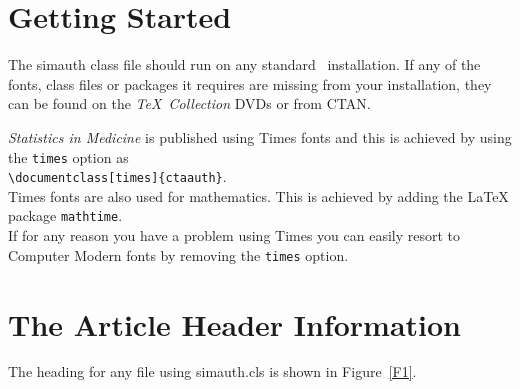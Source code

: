 \documentclass[times]{simauth}
\begin{document}
\section{Getting Started} The \textsf{simauth} class file should run
on any standard \LaTeXe\ installation. If any of the fonts, class
files or packages it requires are missing from your installation,
they can be found on the \emph{\TeX\ Collection} DVDs or from
CTAN.

\emph{Statistics in Medicine} is published using Times fonts and
this is achieved by using the \verb"times" option as\\
\verb"\documentclass[times]{ctaauth}".\\
Times fonts are also used for mathematics. This is achieved by adding the LaTeX package \verb"mathtime".\\
If for any reason you have a problem using Times you can easily
resort to Computer Modern fonts by removing the \verb"times"
option.


\section{The Article Header Information}
The heading for any file using \textsf{simauth.cls} is shown in
Figure~\ref{F1}.
\end{document}
